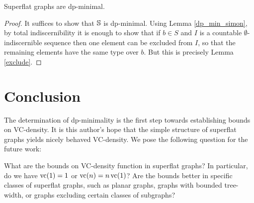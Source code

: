 \begin{Theorem} \label{flat_dp_thm}
  Superflat graphs are dp-minimal.
\end{Theorem}
\begin{proof}
  It suffices to show that $\mathbb S$ is dp-minimal.
  Using Lemma \ref{dp_min_simon}, by total indiscernibility
  it is enough to show that if $b \in S$ and $I$ is a countable $\emptyset$-indiscernible sequence
  then one element can be excluded from $I$, so that the remaining elements have the same type over $b$.
  But this is precisely Lemma \ref{exclude}.
\end{proof}

\section{Conclusion}
The determination of dp-minimality is the first step towards establishing bounds on VC-density.
It is this author's hope that the simple structure of superflat graphs yields nicely behaved VC-density.
We pose the following question for the future work:
\begin{openq} 
  What are the bounds on VC-density function in superflat graphs?
  In particular, do we have $\operatorname{vc}(1) = 1$ or $\operatorname{vc}(n) = n \operatorname{vc}(1)$?
  Are the bounds better in specific classes of superflat graphs,
  such as planar graphs, graphs with bounded tree-width, or graphs excluding certain classes of subgraphs?
\end{openq}
